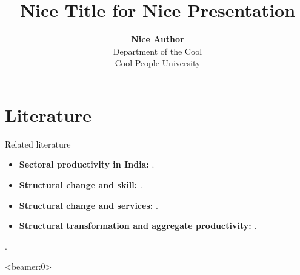 \documentclass[10pt,xcolor={svgnames}]{beamer}
\begin{document}
\title[]{\textbf{Nice Title for Nice Presentation}}
\author[Nice Author]{\textbf{Nice Author} \\
Department of the Cool \\
Cool People University}
\date[]{}

\AtBeginSection[]{\frame{\sectionpage}}
\AtBeginSubsection[]{\frame{\subsectionpage}}

\begin{frame}
	\titlepage
\end{frame}

\section{Literature}

\begin{frame}{Related literature}
	\begin{itemize}
		\item \textbf{Sectoral productivity in India:} \citep{rodrik2004hindugrowth,sivasubramonian2004humancapital,hsieh2009misallocation,broadberry2010historical,eichengreen2011servicegrowth,verma2012tfp,ziebarth2013misallocation,garciasantana2014reservationlaws}.
		\item \textbf{Structural change and skill:} \citep{buera2018skillbiasedstructchange,herrendorf2018humancapital,herrendorf2019China,herrendorf2015endogenous}.
		\item \textbf{Structural change and services:} \citep{buera2012service,duernecker2017structural,duarte2019pricesproductivity}.
		\item \textbf{Structural transformation and aggregate productivity:} \citep{ngai2007structural,restuccia2008aggregateproductivity,duarte2010aggregateproductivity,rodrik2016premature,mcmillanrodrik2014africa}.
	\end{itemize}
\end{frame}

\begin{frame}
	\citet{turnovsky2016population}. \cite{arnold2016servicesreform}
\end{frame}

\begin{frame}<beamer:0>


\end{frame}
\end{document}
